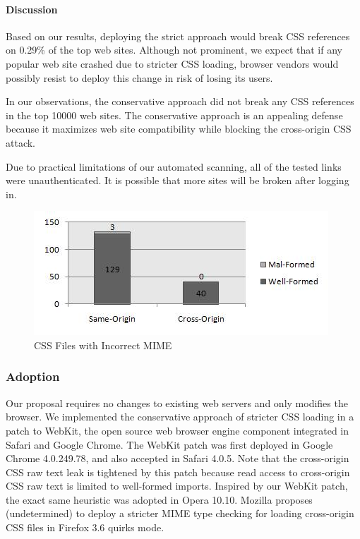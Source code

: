 \documentclass{acm_proc_article-sp}
\begin{document}
{\paragraph{Discussion}
Based on our results, deploying the strict approach would break CSS references on 0.29\% of the top web sites. Although not prominent, we expect that if any popular web site crashed due to stricter CSS loading, browser vendors would possibly resist to deploy this change in risk of losing its users.

In our observations, the conservative approach did not break any CSS references in the top 10000 web sites. The conservative approach is an appealing defense because it maximizes web site compatibility while blocking the cross-origin CSS attack.

Due to practical limitations of our automated scanning, all of the tested links were unauthenticated. It is possible that more sites will be broken after logging in.

\begin{figure}
\centering
\includegraphics[width=\linewidth]{mime.jpg}
\caption{CSS Files with Incorrect MIME}
\end{figure}

\subsubsection{Adoption}
Our proposal requires no changes to existing web servers and only modifies the browser. We implemented the conservative approach of stricter CSS loading in a patch to WebKit, the open source web browser engine component integrated in Safari and Google Chrome. The WebKit patch was first deployed in Google Chrome 4.0.249.78, and also accepted in Safari 4.0.5. Note that the cross-origin CSS raw text leak is tightened by this patch because read access to cross-origin CSS raw text is limited to well-formed imports. Inspired by our WebKit patch, the exact same heuristic was adopted in Opera 10.10. Mozilla proposes (undetermined) to deploy a stricter MIME type checking for loading cross-origin CSS files in Firefox 3.6 quirks mode.

}
\end{document}
